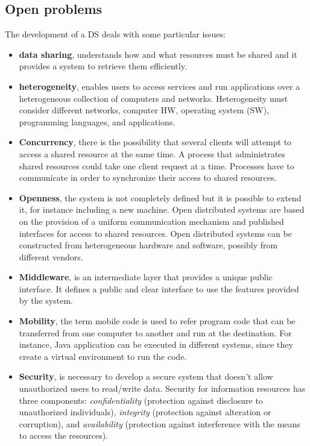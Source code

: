 \documentclass[11pt,a4paper]{article}
\begin{document}
\subsection{Open problems}
The development of a DS deals with some particular issues:
\begin{itemize}
    \item \textbf{data sharing}, understands how and what resources must be shared and it provides a system to retrieve them efficiently.
    \item \textbf{heterogeneity}, enables users to access services and run applications over a heterogeneous collection of computers and networks. Heterogeneity must consider different networks, computer HW, operating system (SW), programming languages, and applications.
    \item \textbf{Concurrency}, there is the possibility that several clients will attempt to access a shared resource at the same time. A process that administrates shared resources could take one client request at a time. Processes have to communicate in order to synchronize their access to shared resources.
    \item \textbf{Openness}, the system is not completely defined but it is possible to extend it, for instance including a new machine. Open distributed systems are based on the provision of a uniform communication mechanism and published interfaces for access to shared resources. Open distributed systems can be constructed from heterogeneous hardware and software, possibly from different vendors.
    \item \textbf{Middleware}, is an intermediate layer that provides a unique public interface. It defines a public and clear interface to use the features provided by the system.
    \item \textbf{Mobility}, the term mobile code is used to refer program code that can be transferred from one computer to another and run at the destination. For instance, Java application can be executed in different systems, since they create a virtual environment to run the code.
    \item \textbf{Security}, is necessary to develop a secure system that doesn't allow unauthorized users to read/write data. Security for information resources has three components: \textit{confidentiality} (protection against disclosure to unauthorized individuals), \textit{integrity} (protection against alteration or corruption), and \textit{availability} (protection against interference with the means to access the resources).

\end{itemize}
\end{document}
